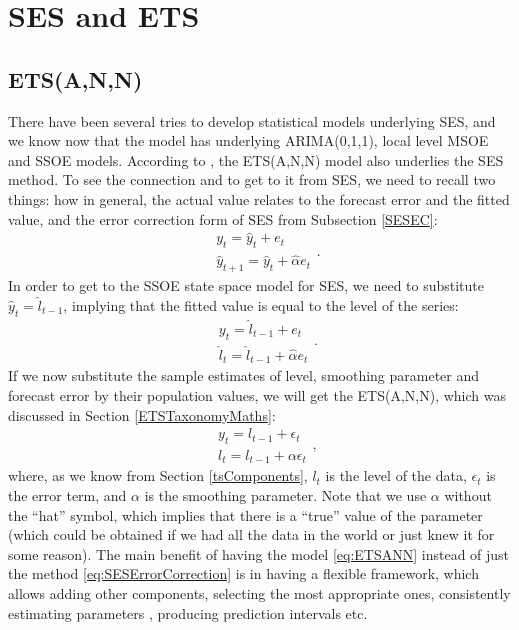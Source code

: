 \documentclass[
]{book}
\theoremstyle{definition}
\theoremstyle{definition}
\theoremstyle{definition}
\theoremstyle{definition}
\theoremstyle{remark}
\begin{document}
\hypertarget{SESandETS}{%
\section{SES and ETS}\label{SESandETS}}

\hypertarget{etsann}{%
\subsection{ETS(A,N,N)}\label{etsann}}

There have been several tries to develop statistical models underlying SES, and we know now that the model has underlying ARIMA(0,1,1), local level MSOE \citep[Multiple Source of Error,][]{Muth1960} and SSOE \citep[Single Source of Error,][]{Snyder1985} models. According to \citet{Hyndman2002}, the ETS(A,N,N) model also underlies the SES method. To see the connection and to get to it from SES, we need to recall two things: how in general, the actual value relates to the forecast error and the fitted value, and the error correction form of SES from Subsection \ref{SESEC}:
\begin{equation}
  \begin{aligned}
    & y_t = \hat{y}_{t} + e_t \\
    & \hat{y}_{t+1} = \hat{y}_{t} + \hat{\alpha} e_{t}
  \end{aligned} .
  \label{eq:ETSANNDerivation01}
\end{equation}
In order to get to the SSOE state space model for SES, we need to substitute \(\hat{y}_t=\hat{l}_{t-1}\), implying that the fitted value is equal to the level of the series:
\begin{equation}
  \begin{aligned}
    & y_t = \hat{l}_{t-1} + e_t \\
    & \hat{l}_{t} = \hat{l}_{t-1} + \hat{\alpha} e_{t}
  \end{aligned} .
  \label{eq:ETSANN}
\end{equation}
If we now substitute the sample estimates of level, smoothing parameter and forecast error by their population values, we will get the ETS(A,N,N), which was discussed in Section \ref{ETSTaxonomyMaths}:
\begin{equation}
  \begin{aligned}
    & y_{t} = l_{t-1} + \epsilon_t \\
    & l_t = l_{t-1} + \alpha \epsilon_t
  \end{aligned} ,
  \label{eq:ETSANN}
\end{equation}
where, as we know from Section \ref{tsComponents}, \(l_t\) is the level of the data, \(\epsilon_t\) is the error term, and \(\alpha\) is the smoothing parameter. Note that we use \(\alpha\) without the ``hat'' symbol, which implies that there is a ``true'' value of the parameter (which could be obtained if we had all the data in the world or just knew it for some reason). The main benefit of having the model \eqref{eq:ETSANN} instead of just the method \eqref{eq:SESErrorCorrection} is in having a flexible framework, which allows adding other components, selecting the most appropriate ones, consistently estimating parameters \citep[see Section 4.3 of][]{SvetunkovSBA}, producing prediction intervals etc.
\end{document}
